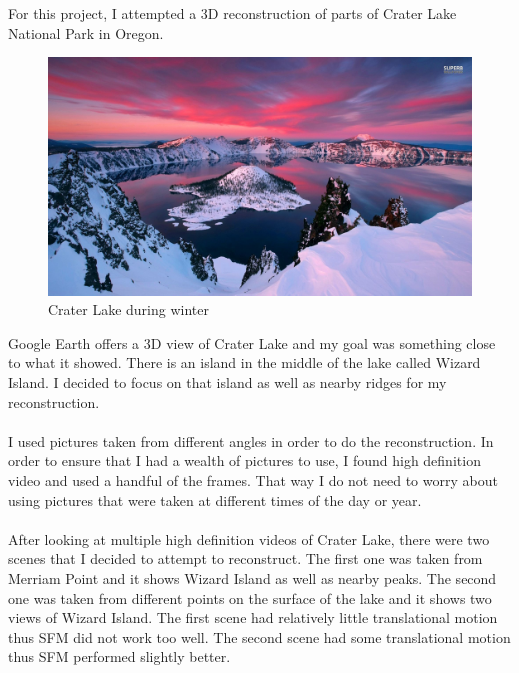 \documentclass[11pt,psfig]{article}
\begin{document}
For this project, I attempted a 3D reconstruction of parts of Crater Lake National Park in Oregon.
\begin{figure}[H]
\centering
\includegraphics[width=\columnwidth]{craterLakeWinter.jpg}
\caption{Crater Lake during winter}
\end{figure}
Google Earth offers a 3D view of Crater Lake and my goal was something close to what it showed. There is an island in the middle of the lake called Wizard Island. I decided to focus on that island as well as nearby ridges for my reconstruction. \\
\\
I used pictures taken from different angles in order to do the reconstruction. In order to ensure that I had a wealth of pictures to use, I found high definition video and used a handful of the frames. That way I do not need to worry about using pictures that were taken at different times of the day or year.\\
\\
After looking at multiple high definition videos of Crater Lake, there were two scenes that I decided to attempt to reconstruct. The first one was taken from Merriam Point and it shows Wizard Island as well as nearby peaks. The second one was taken from different points on the surface of the lake and it shows two views of Wizard Island. The first scene had relatively little translational motion thus SFM did not work too well. The second scene had some translational motion thus SFM performed slightly better. 
\end{document}
